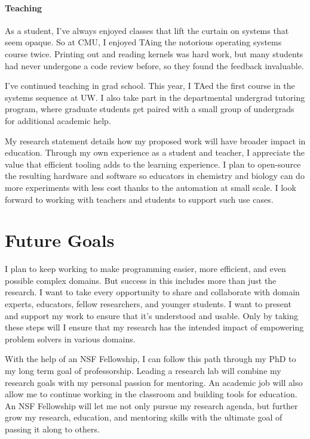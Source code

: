 \documentclass[12pt]{article}
\begin{document}
\paragraph{Teaching}

As a student, I've always enjoyed classes that lift the curtain on systems that seem opaque.
So at CMU, I enjoyed TAing the notorious operating systems course twice.
Printing out and reading kernels was hard work, but many students had never undergone a code review before, so they found the feedback invaluable.

I've continued teaching in grad school. This year, I TAed the first course in the systems sequence at UW.
I also take part in the departmental undergrad tutoring program, where graduate students get paired with a small group of undergrads for additional academic help.

My research statement details how my proposed work will have broader impact in education.
Through my own experience as a student and teacher, I appreciate the value that efficient tooling adds to the learning experience.
I plan to open-source the resulting hardware and software so educators in chemistry and biology can do more experiments with less cost thanks to the automation at small scale.
I look forward to working with teachers and students to support such use cases.

\section*{Future Goals}

I plan to keep working to make programming easier, more efficient, and even possible complex domains.
But success in this includes more than just the research.
I want to take every opportunity to share and collaborate with domain experts, educators, fellow researchers, and younger students.
I want to present and support my work to ensure that it's understood and usable.
Only by taking these steps will I ensure that my research has the intended impact of empowering problem solvers in various domains.

With the help of an NSF Fellowship, I can follow this path through my PhD to my long term goal of professorship.
Leading a research lab will combine my research goals with my personal passion for mentoring.
An academic job will also allow me to continue working in the classroom and building tools for education.
An NSF Fellowship will let me not only pursue my research agenda, but further grow my research, education, and mentoring skills with the ultimate goal of passing it along to others.
\end{document}
